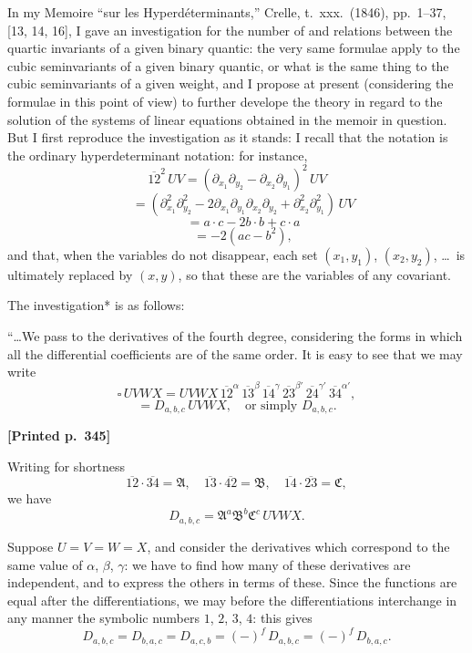 \documentclass[11pt]{article}
\begin{document}
In my Memoire ``sur les Hyperd\'eterminants,'' Crelle, t.~xxx.\ (1846), pp.~1--37, [13, 14, 16], I gave an investigation for the number of and relations between the quartic invariants of a given binary quantic: the very same formulae apply to the cubic seminvariants of a given binary quantic, or what is the same thing to the cubic seminvariants of a given weight, and I propose at present (considering the formulae in this point of view) to further develope the theory in regard to the solution of the systems of linear equations obtained in the memoir in question. But I first reproduce the investigation as it stands: I recall that the notation is the ordinary hyperdeterminant notation: for instance,
\[
\overline{12}^{2}\, UV = (\partial_{x_{1}}\partial_{y_{2}} - \partial_{x_{2}}\partial_{y_{1}})^{2}\, UV
\]
\[
\quad = (\partial_{x_{1}}^{2}\partial_{y_{2}}^{2} - 2\partial_{x_{1}}\partial_{y_{1}}\partial_{x_{2}}\partial_{y_{2}} + \partial_{x_{2}}^{2}\partial_{y_{1}}^{2})\, UV
\]
\[
\quad = a \cdot c - 2b \cdot b + c \cdot a
\]
\[
\quad = -2(ac - b^{2}),
\]
and that, when the variables do not disappear, each set $(x_{1}, y_{1})$, $(x_{2}, y_{2})$, \dots\ is ultimately replaced by $(x, y)$, so that these are the variables of any covariant.

The investigation* is as follows:


\medskip

``\dots We pass to the derivatives of the fourth degree, considering the forms in which all the differential coefficients are of the same order. It is easy to see that we may write
\[
\square\, UVWX = UVWX\,\overline{12}^{\alpha}\,\overline{13}^{\beta}\,\overline{14}^{\gamma}\,\overline{23}^{\beta'}\,\overline{24}^{\gamma'}\,\overline{34}^{\alpha'},
\]
\[
= D_{a, b, c}\, UVWX,\quad\text{or simply } D_{a, b, c}.
\]

\medskip

\noindent\textbf{[Printed p.~345]}\hfill

Writing for shortness
\[
\overline{12}\cdot\overline{34} = \mathfrak{A},\quad \overline{13}\cdot\overline{42} = \mathfrak{B},\quad \overline{14}\cdot\overline{23} = \mathfrak{C},
\]
we have
\[
D_{a, b, c} = \mathfrak{A}^{a}\mathfrak{B}^{b}\mathfrak{C}^{c}\, UVWX.
\]

Suppose $U = V = W = X$, and consider the derivatives which correspond to the same value of $\alpha$, $\beta$, $\gamma$: we have to find how many of these derivatives are independent, and to express the others in terms of these. Since the functions are equal after the differentiations, we may before the differentiations interchange in any manner the symbolic numbers $1$, $2$, $3$, $4$: this gives
\[
D_{a, b, c} = D_{b, a, c} = D_{a, c, b} = (-)^{f}\, D_{a, b, c} = (-)^{f}\, D_{b, a, c}.
\]
\end{document}
